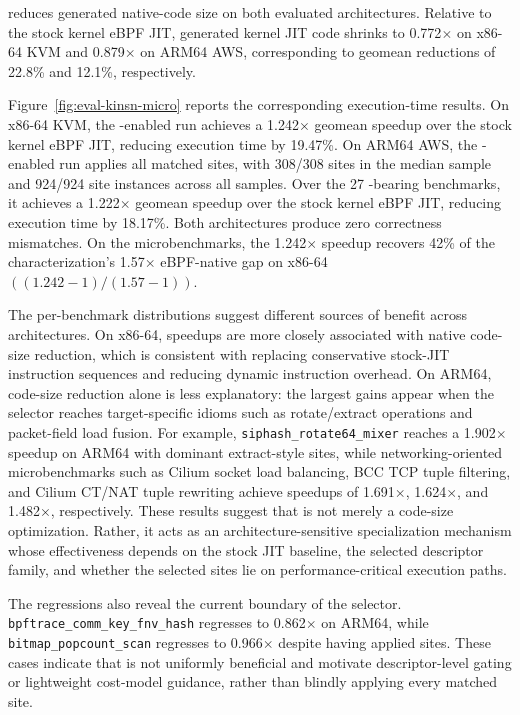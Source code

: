 

\lang reduces generated native-code size on both evaluated architectures. Relative to the stock kernel eBPF JIT, generated kernel JIT code shrinks to 0.772$\times$ on x86-64 KVM and 0.879$\times$ on ARM64 AWS, corresponding to geomean reductions of 22.8\% and 12.1\%, respectively.

Figure~\ref{fig:eval-kinsn-micro} reports the corresponding execution-time results. On x86-64 KVM, the \lang-enabled run achieves a 1.242$\times$ geomean speedup over the stock kernel eBPF JIT, reducing execution time by 19.47\%. On ARM64 AWS, the \lang-enabled run applies all matched \lang sites, with 308/308 sites in the median sample and 924/924 site instances across all samples. Over the 27 \lang-bearing benchmarks, it achieves a 1.222$\times$ geomean speedup over the stock kernel eBPF JIT, reducing
execution time by 18.17\%. Both architectures produce zero correctness mismatches. On the microbenchmarks, the 1.242$\times$ speedup recovers 42\% of the characterization's 1.57$\times$ eBPF-native gap on x86-64 $((1.242{-}1)/(1.57{-}1))$.


The per-benchmark distributions suggest different sources of benefit across architectures. On x86-64, speedups are more closely associated with native code-size reduction, which is consistent with \lang replacing conservative stock-JIT instruction sequences and reducing dynamic instruction overhead. On ARM64, code-size reduction alone is less explanatory: the largest gains appear when the selector reaches target-specific idioms such as rotate/extract operations and packet-field load fusion. For example, \texttt{siphash\_rotate64\_\allowbreak mixer} reaches a 1.902$\times$ speedup on ARM64 with dominant extract-style sites, while networking-oriented microbenchmarks such as Cilium socket load balancing, BCC TCP tuple filtering, and Cilium CT/NAT tuple rewriting achieve speedups of 1.691$\times$, 1.624$\times$, and 1.482$\times$, respectively. These results suggest that \lang is not merely a code-size optimization. Rather, it acts as an architecture-sensitive specialization mechanism whose effectiveness depends on the stock JIT baseline, the selected descriptor family, and whether the selected sites lie on performance-critical execution paths.

The regressions also reveal the current boundary of the selector. \texttt{bpftrace\_comm\_key\_fnv\_hash} regresses to 0.862$\times$ on ARM64, while \texttt{bitmap\_popcount\_scan} regresses to 0.966$\times$ despite having applied \lang sites. These cases indicate that \lang is not uniformly beneficial and motivate descriptor-level gating or lightweight cost-model guidance, rather than blindly applying every matched \lang site.

